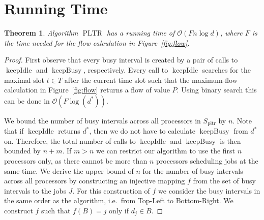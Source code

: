 \documentclass[a4paper]{article}
\DeclareMathOperator{\pltr}{pltr}
\DeclareMathOperator{\PLTR}{PLTR}
\DeclareMathOperator{\keepidle}{keepIdle}
\DeclareMathOperator{\keepbusy}{keepBusy}
\newtheorem{theorem}{Theorem}
\begin{document}
\section{Running Time}\label{section:running_time}
\begin{theorem}
  Algorithm $\PLTR$ has a running time of $\mathcal{O}(F n \log d)$, where $F$ is the time needed for the flow calculation in Figure~\ref{fig:flow}.
\end{theorem}
\begin{proof}
  First observe that every busy interval is created by a pair of calls to $\keepidle$ and $\keepbusy$, respectively.
  Every call to $\keepidle$ searches for the maximal slot $t \in T$ after the current time slot such that the maximum-flow calculation in Figure~\ref{fig:flow} returns a flow of value $P$.
  Using binary search this can be done in $\mathcal{O}(F \log(d^*))$.

  We bound the number of busy intervals across all processors in $S_{\pltr}$ by $n$.
  Note that if $\keepidle$ returns $d^*$, then we do not have to calculate $\keepbusy$ from $d^*$ on.
  Therefore, the total number of calls to $\keepidle$ and $\keepbusy$ is then bounded by $n + m$.
  If $m > n$ we can restrict our algorithm to use the first $n$ processors only, as there cannot be more than $n$ processors scheduling jobs at the same time.
  We derive the upper bound of $n$ for the number of busy intervals across all processors by constructing an injective mapping $f$ from the set of busy intervals to the jobs $J$.
  For this construction of $f$ we consider the busy intervals in the same order as the algorithm, i.e.\ from Top-Left to Bottom-Right.
  We construct $f$ such that $f(B) = j$ only if $d_j \in B$.


\end{proof}
\end{document}
